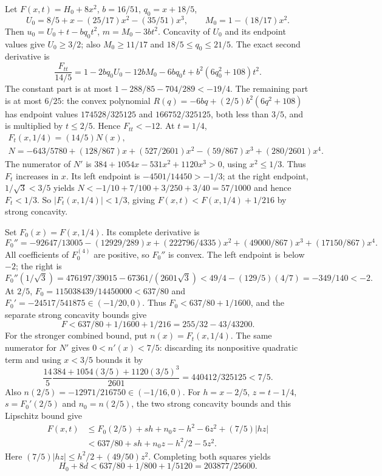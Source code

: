 Let $F(x,t)=H_0+8x^2$, $b=16/51$, $q_0=x+18/5$,
\[
U_0=8/5+x-(25/17)x^2-(35/51)x^3,\qquad M_0=1-(18/17)x^2.
\]
Then $u_0=U_0+t-bq_0t^2$, $m=M_0-3bt^2$.
Concavity of $U_0$ and its endpoint values give $U_0\ge3/2$;
also $M_0\ge11/17$ and $18/5\le q_0\le21/5$.
The exact second derivative is
\[
\frac{F_{tt}}{14/5}=1-2bq_0U_0-12bM_0-6bq_0t
+b^2(6q_0^2+108)t^2.
\]
The constant part is at most $1-288/85-704/289<-19/4$.
The remaining part is at most $6/25$: the convex polynomial
$R(q)=-6bq+(2/5)b^2(6q^2+108)$ has endpoint values
$174528/325125$ and $166752/325125$, both less than $3/5$,
and is multiplied by $t\le2/5$. Hence $F_{tt}<-12$.
At $t=1/4$,
\[
\begin{gathered}
F_t(x,1/4)=(14/5)N(x),\\
N=-643/5780+(128/867)x+(527/2601)x^2
-(59/867)x^3+(280/2601)x^4.
\end{gathered}
\]
The numerator of $N'$ is $384+1054x-531x^2+1120x^3>0$, using
$x^2\le1/3$. Thus $F_t$ increases in $x$. Its left endpoint is
$-4501/14450>-1/3$; at the right endpoint, $1/\sqrt3<3/5$ yields
$N<-1/10+7/100+3/250+3/40=57/1000$ and hence $F_t<1/3$.
So $|F_t(x,1/4)|<1/3$, giving
$F(x,t)<F(x,1/4)+1/216$ by strong concavity.

Set $F_0(x)=F(x,1/4)$. Its complete derivative is
\[
F_0''=-92647/13005-(12929/289)x+(222796/4335)x^2
+(49000/867)x^3+(17150/867)x^4.
\]
All coefficients of $F_0^{(4)}$ are positive, so $F_0''$ is convex.
The left endpoint is below $-2$; the right is
\[
F_0''(1/\sqrt3)=476197/39015-67361/(2601\sqrt3)
<49/4-(129/5)(4/7)=-349/140<-2.
\]
At $2/5$,
$F_0=115038439/14450000<637/80$ and
$F_0'=-24517/541875\in(-1/20,0)$.
Thus $F_0<637/80+1/1600$, and the separate strong concavity bounds give
\[
F<637/80+1/1600+1/216=255/32-43/43200.
\]
For the stronger combined bound, put $n(x)=F_t(x,1/4)$.
The same numerator for $N'$ gives $0<n'(x)<7/5$: discarding its
nonpositive quadratic term and using $x<3/5$ bounds it by
\[
\frac{14}{5}\frac{384+1054(3/5)+1120(3/5)^3}{2601}
=440412/325125<7/5.
\]
Also $n(2/5)=-12971/216750\in(-1/16,0)$.
For $h=x-2/5$, $z=t-1/4$, $s=F_0'(2/5)$ and $n_0=n(2/5)$,
the two strong concavity bounds and this Lipschitz bound give
\[
\begin{aligned}
F(x,t)&\le F_0(2/5)+sh+n_0z-h^2-6z^2+(7/5)|hz|\\
&<637/80+sh+n_0z-h^2/2-5z^2.
\end{aligned}
\]
Here $(7/5)|hz|\le h^2/2+(49/50)z^2$.
Completing both squares yields
\begin{equation}\tag{L37.8.9}\label{eq:L37:anchor}
H_0+8d<637/80+1/800+1/5120=203877/25600.
\end{equation}

